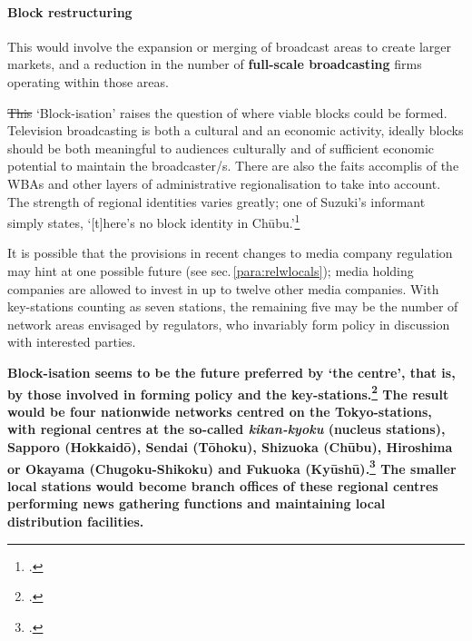 \documentclass[11pt, oneside, a4paper, headsepline]{scrartcl}
\newcommand{\citej}[2] {\footcite[\nopp #1]{#2} }
\begin{document}
\paragraph*{Block restructuring} This would involve the expansion or merging of broadcast areas to create larger markets, and a reduction in the number of \textbf{full-scale broadcasting} firms operating within those areas.

\st{This} `Block-isation' raises the question of where viable blocks could be formed. Television broadcasting is both a cultural and an economic activity, ideally blocks should be both meaningful to audiences culturally and of sufficient economic potential to maintain the broadcaster/s. There are also the faits accomplis of the WBAs and other layers of administrative regionalisation to take into account. The strength of regional identities varies greatly; one of Suzuki's informant simply states, `[t]here's no block identity in Ch\={u}bu.'\citej{103}{Suzuki:2004}

It is possible that the provisions in recent changes to media company regulation may hint at one possible future (see sec.\,\ref{para:relwlocals}); media holding companies are allowed to invest in up to twelve other media companies. With key-stations counting as seven stations, the remaining five may be the number of network areas envisaged by regulators, who invariably form policy in discussion with interested parties.


{\bf Block-isation seems to be the future preferred by `the centre', that is, by those involved in forming policy and the key-stations.\citej{181--3}{Suzuki:2004} The result would be four nationwide networks centred on the Tokyo-stations, with regional centres at the so-called \emph{kikan-kyoku} (nucleus stations), Sapporo (Hokkaidō), Sendai (Tōhoku), Shizuoka (Chūbu), Hiroshima or Okayama (Chugoku-Shikoku) and Fukuoka (Kyūshū).\citej{173--4}{Suzuki:2004} The smaller local stations would become branch offices of these regional centres performing news gathering functions and maintaining local distribution facilities.
}
\end{document}
